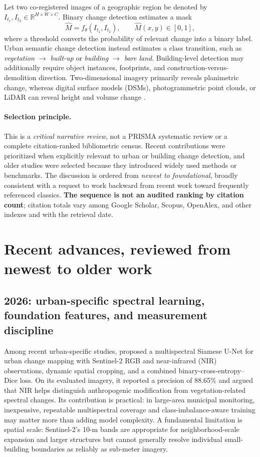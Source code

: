 \documentclass[11pt,a4paper]{article}
\begin{document}
Let two co-registered images of a geographic region be denoted by $I_{t_1},I_{t_2}\in\mathbb{R}^{H\times W\times C}$. Binary change detection estimates a mask
\begin{equation}
  \hat{M}=f_{\theta}(I_{t_1},I_{t_2}),\qquad \hat{M}(x,y)\in[0,1],
  \label{eq:cd}
\end{equation}
where a threshold converts the probability of relevant change into a binary label. Urban semantic change detection instead estimates a class transition, such as \emph{vegetation $\rightarrow$ built-up} or \emph{building $\rightarrow$ bare land}. Building-level detection may additionally require object instances, footprints, and construction-versus-demolition direction. Two-dimensional imagery primarily reveals planimetric change, whereas digital surface models (DSMs), photogrammetric point clouds, or LiDAR can reveal height and volume change \citep{Gomroki2026}.

\paragraph{Selection principle.} This is a \emph{critical narrative review}, not a PRISMA systematic review or a complete citation-ranked bibliometric census. Recent contributions were prioritized when explicitly relevant to urban or building change detection, and older studies were selected because they introduced widely used methods or benchmarks. The discussion is ordered from \emph{newest to foundational}, broadly consistent with a request to work backward from recent work toward frequently referenced classics. \textbf{The sequence is not an audited ranking by citation count}; citation totals vary among Google Scholar, Scopus, OpenAlex, and other indexes and with the retrieval date.

\section{Recent advances, reviewed from newest to older work}

\subsection{2026: urban-specific spectral learning, foundation features, and measurement discipline}

Among recent urban-specific studies, \citet{Pal2026} proposed a multispectral Siamese U-Net for urban change mapping with Sentinel-2 RGB and near-infrared (NIR) observations, dynamic spatial cropping, and a combined binary-cross-entropy--Dice loss. On its evaluated imagery, it reported a precision of 88.65\% and argued that NIR helps distinguish anthropogenic modification from vegetation-related spectral changes. Its contribution is practical: in large-area municipal monitoring, inexpensive, repeatable multispectral coverage and class-imbalance-aware training may matter more than adding model complexity. A fundamental limitation is spatial scale: Sentinel-2's 10-m bands are appropriate for neighborhood-scale expansion and larger structures but cannot generally resolve individual small-building boundaries as reliably as sub-meter imagery.
\end{document}
